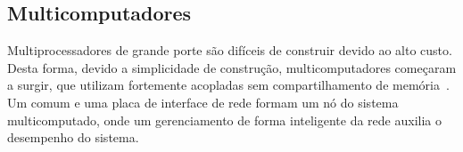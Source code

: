 %
%
%
%
%
%
%
%
%
\subsection{Multicomputadores}

%
%
%
%
Multiprocessadores de grande porte são difíceis de construir devido ao alto
custo. Desta forma, devido a simplicidade de construção, multicomputadores
começaram a surgir, que utilizam \cpus fortemente acopladas sem compartilhamento
de memória~\cite{Tanenbaum2015}. Um \pc comum e uma placa de interface de rede formam um nó do
sistema multicomputado, onde um gerenciamento de forma inteligente da rede auxilia o desempenho
do sistema.

